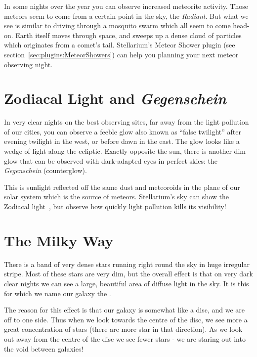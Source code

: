 In some nights over the year you can observe increased meteorite
activity. Those meteors seem to come from a certain point in the sky,
the \emph{Radiant}. But what we see is similar to driving through a
mosquito swarm which all seem to come head-on. Earth itself moves
through space, and sweeps up a dense cloud of particles which
originates from a comet's tail. Stellarium's Meteor Shower plugin (see
section~\ref{sec:plugins:MeteorShowers}) can help you planning your next
meteor observing night.

\section{Zodiacal Light and \emph{Gegenschein}}
\label{sec:Phenomena:ZodiacalLight}

In very clear nights on the best observing sites, far away from the
light pollution of our cities, you can observe a feeble glow also
known as ``false twilight'' after evening twilight in the west, or
before dawn in the east. The glow looks like a wedge of light along
the ecliptic. Exactly opposite the sun, there is another dim glow that
can be observed with dark-adapted eyes in perfect skies: the
\emph{Gegenschein} (counterglow). 

This is sunlight reflected off the same dust and meteoroids in the
plane of our solar system which is the source of meteors. Stellarium's
sky can show the Zodiacal light~\cite{Kwon:2004:ZodiacalLight}, but
observe how quickly light pollution kills its visibility!


\section{The Milky Way}
\label{sec:Phenomena:MilkyWay}

There is a band of very dense stars running right round the sky in huge
irregular stripe. Most of these stars are very dim, but the overall
effect is that on very dark clear nights we can see a large, beautiful
area of diffuse light in the sky. It is this for which we name our
galaxy the .

The reason for this effect is that our galaxy is somewhat like a disc,
and we are off to one side. Thus when we look towards the centre of the
disc, we see more a great concentration of stars (there are more star in
that direction). As we look out away from the centre of the disc we see
fewer stars - we are staring out into the void between galaxies!

